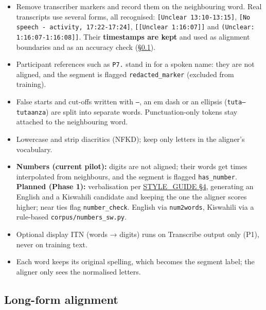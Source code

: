 \documentclass[11pt]{article}
\begin{document}
\begin{itemize}
\tightlist
\item
  Remove transcriber markers and record them on the neighbouring word. Real transcripts use several forms, all recognised: \texttt{[Unclear 13:10-13:15]}, \texttt{[No speech - activity, 17:22-17:24]}, \texttt{[[Unclear 1:16:07]]} and \texttt{(Unclear: 1:16:07-1:16:08]]}. Their \textbf{timestamps are kept} and used as alignment boundaries and as an accuracy check (§\ref{long-form-alignment}).
\item
  Participant references such as \texttt{P7.} stand in for a spoken name: they are not aligned, and the segment is flagged \texttt{redacted\_\allowbreak{}marker} (excluded from training).
\item
  False starts and cut-offs written with \texttt{--}, an em dash or an ellipsis (\texttt{tuta--tutaanza}) are split into separate words. Punctuation-only tokens stay attached to the neighbouring word.
\item
  Lowercase and strip diacritics (NFKD); keep only letters in the aligner's vocabulary.
\item
  \textbf{Numbers (current pilot):} digits are not aligned; their words get times interpolated from neighbours, and the segment is flagged \texttt{has\_\allowbreak{}number}. \textbf{Planned (Phase 1):} verbalisation per \href{STYLE_GUIDE.pdf}{STYLE\_GUIDE §4}, generating an English and a Kiswahili candidate and keeping the one the aligner scores higher; near ties flag \texttt{number\_\allowbreak{}check}. English via \texttt{num2words}, Kiswahili via a rule-based \texttt{corpus/\allowbreak{}numbers\_\allowbreak{}sw.\allowbreak{}py}.
\item
  Optional display ITN (words → digits) runs on Transcribe output only (P1), never on training text.
\item
  Each word keeps its original spelling, which becomes the segment label; the aligner only sees the normalised letters.
\end{itemize}

\hypertarget{long-form-alignment}{%
\subsection{Long-form alignment}\label{long-form-alignment}}
\end{document}
